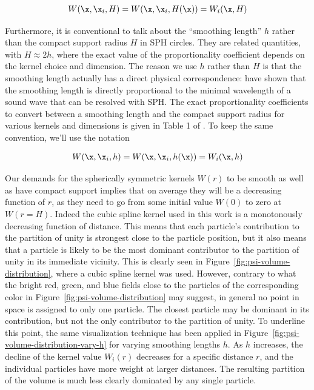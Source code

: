 \begin{align}
    W(\x, \x_i, H) = W(\x, \x_i, H(\x)) = W_i(\x, H)
\end{align}


Furthermore, it is conventional to talk about the ``smoothing length'' $h$ rather
than the compact support radius $H$ in SPH circles. They are related quantities, with $H \approx
2h$, where the exact value of the proportionality coefficient depends on the kernel choice and
dimension. The reason we use $h$ rather than $H$ is that the smoothing length actually has a direct
physical correspondence: \cite{dehnenImprovingConvergenceSmoothed2012c} have shown that the smoothing
length is directly proportional to the minimal wavelength of a sound wave that can be resolved with
SPH. The exact proportionality coefficients to convert between a smoothing length and the compact
support radius for various kernels and dimensions is given in Table 1 of
\cite{dehnenImprovingConvergenceSmoothed2012c}. To keep the same convention, we'll use the notation

\begin{align}
    W(\x, \x_i, h) = W(\x, \x_i, h(\x)) = W_i(\x, h)
\end{align}


Our demands for the spherically symmetric kernels $W(r)$ to be smooth as well as have compact
support implies that on average they will be a decreasing function of $r$, as they need to go from
some initial value $W(0)$ to zero at $W(r=H)$. Indeed the cubic spline kernel used in this work is
a monotonously decreasing function of distance. This means that each particle's contribution to the
partition of unity is strongest close to the particle position, but it also means that a particle is
likely to be the most dominant contributor to the partition of unity in its immediate vicinity.
This is clearly seen in Figure~\ref{fig:psi-volume-distribution}, where a cubic spline kernel was
used. However, contrary to what the bright red, green, and blue fields close to the particles of
the corresponding color in Figure~\ref{fig:psi-volume-distribution} may suggest, in general no point
in space is assigned to only one particle. The closest particle may be dominant in its
contribution, but not the only contributor to the partition of unity. To underline this point, the
same visualization technique has been applied in Figure~\ref{fig:psi-volume-distribution-vary-h}
for varying smoothing lengths $h$. As $h$ increases, the decline of the kernel value $W_i(r)$
decreases for a specific distance $r$, and the individual particles have more weight at larger
distances. The resulting partition of the volume is much less clearly dominated by any single
particle.


